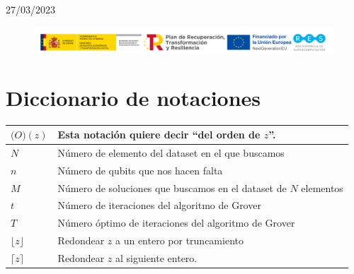 \documentclass[a4paper,11pt]{article} %
\numberwithin{equation}{section}
\begin{document}
\begin{center}
\vspace{1cm}
{\Large 27/03/2023}
\end{center}

	\begin{figure}[b]
	\centering 
	\includegraphics[width=1\linewidth]{Figuras/Fig-LOGOS-GOB_QS.png}
	\end{figure}

\newpage
\thispagestyle{empty}
\mbox{}

\newpage
\pagestyle{plain}
\tableofcontents
\newpage







\newpage
\section*{Diccionario de notaciones}

\begin{table}[H]
\centering
\begin{tabular}{ll}
\hline
\textbf{$\mathcal(O)(z)$}     & Esta notación quiere decir ``del orden de $z$''.                 \\ \hline
\textbf{$N$}                  & Número de elemento del dataset en el que buscamos                \\ \hline
\textbf{$n$}                  & Número de qubits que nos hacen falta                             \\ \hline
\textbf{$M$}                  & Número de soluciones que buscamos en el dataset de $N$ elementos \\ \hline
\textbf{$t$}                  & Número de iteraciones del algoritmo de Grover                    \\ \hline
\textbf{$T$}                  & Número óptimo de iteraciones del algoritmo de Grover             \\ \hline
\textbf{$\lfloor z \rfloor $} & Redondear $z$ a un entero por truncamiento                       \\ \hline
\textbf{$\lceil z \rceil$}    & Redondear $z$ al siguiente entero.                               \\ \hline
\end{tabular}
\end{table}
\end{document}

